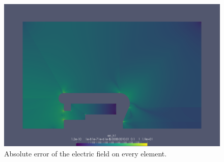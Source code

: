 \begin{center}
\begin{figure}[H]
  \includegraphics[width=\textwidth]{figures/60kV/error_elem}
  \caption{Absolute error of the electric field on every element.}
  \label{fig:error_elem}
\end{figure}
\end{center}
